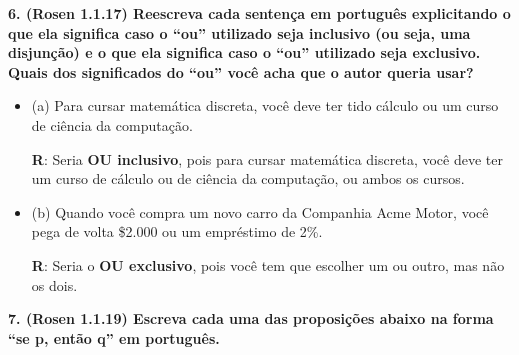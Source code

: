 \documentclass{article}
\begin{document}
\vspace{1cm}

\textbf{6. (Rosen 1.1.17) Reescreva cada sentença em português explicitando o que ela significa caso o “ou” utilizado seja inclusivo (ou seja, uma disjunção) e o que ela significa caso o “ou” utilizado seja exclusivo. Quais dos significados do “ou” você acha que o autor queria usar?}

\begin{itemize}[label={}]
    \item (a) Para cursar matemática discreta, você deve ter tido cálculo ou um curso de ciência da computação. \> 
    
    \textbf{R}: Seria \textbf{OU inclusivo}, pois para cursar matemática discreta, você deve ter um curso de cálculo ou de ciência da computação, ou ambos os cursos. \\
    
    \item (b) Quando você compra um novo carro da Companhia Acme Motor, você pega de volta \$2.000 ou um empréstimo de 2\%. \> 
    
    \textbf{R}: Seria o \textbf{OU exclusivo}, pois você tem que escolher um ou outro, mas não os dois. \\
\end{itemize}

\vspace{1cm}

\textbf{7. (Rosen 1.1.19) Escreva cada uma das proposições abaixo na forma “se p, então q” em português.}
\end{document}
